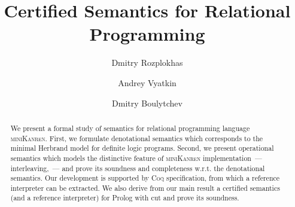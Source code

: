\documentclass[sigplan,10pt,anonymous,review]{acmart}
\begin{document}
\title{Certified Semantics for Relational Programming} %



\author{Dmitry Rozplokhas}

\author{Andrey Vyatkin}

\author{Dmitry Boulytchev}



\begin{abstract}
  We present a formal study of semantics for relational programming language \textsc{miniKanren}. First,
  we formulate denotational semantics which corresponds to the minimal Herbrand model for definite logic
  programs. Second, we present operational semantics which models the distinctive feature of \textsc{miniKanren}
  implementation~--- interleaving,~--- and prove its soundness and completeness w.r.t. the denotational semantics.
  Our development is supported by \textsc{Coq} specification, from which a reference interpreter can be
  extracted. We also derive from our main result a certified semantics (and a reference interpreter) for Prolog
  with cut and prove its soundness.   
\end{abstract}
\end{document}

